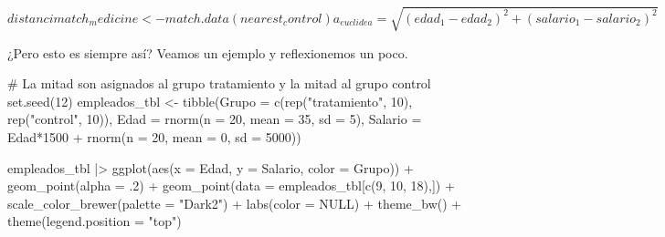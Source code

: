 \documentclass[
  letterpaper,
  DIV=11,
  numbers=noendperiod,
  oneside]{scrreprt}
\newenvironment{Shaded}{\begin{snugshade}}{\end{snugshade}}
\newcommand{\AttributeTok}[1]{\textcolor[rgb]{0.40,0.45,0.13}{#1}}
\newcommand{\CommentTok}[1]{\textcolor[rgb]{0.37,0.37,0.37}{#1}}
\newcommand{\ConstantTok}[1]{\textcolor[rgb]{0.56,0.35,0.01}{#1}}
\newcommand{\DecValTok}[1]{\textcolor[rgb]{0.68,0.00,0.00}{#1}}
\newcommand{\FunctionTok}[1]{\textcolor[rgb]{0.28,0.35,0.67}{#1}}
\newcommand{\NormalTok}[1]{\textcolor[rgb]{0.00,0.23,0.31}{#1}}
\newcommand{\OtherTok}[1]{\textcolor[rgb]{0.00,0.23,0.31}{#1}}
\newcommand{\SpecialCharTok}[1]{\textcolor[rgb]{0.37,0.37,0.37}{#1}}
\newcommand{\StringTok}[1]{\textcolor[rgb]{0.13,0.47,0.30}{#1}}
\begin{document}
\[
distancimatch_medicine <- match.data(nearest_control)a_{euclidea} = \sqrt{(edad_1 - edad_2)^2 + (salario_1 - salario_2)^2}
\]

¿Pero esto es siempre así? Veamos un ejemplo y reflexionemos un poco.

\begin{Shaded}
\begin{Highlighting}[]
\CommentTok{\# La mitad son asignados al grupo tratamiento y la mitad al grupo control}
\FunctionTok{set.seed}\NormalTok{(}\DecValTok{12}\NormalTok{)}
\NormalTok{empleados\_tbl }\OtherTok{\textless{}{-}} \FunctionTok{tibble}\NormalTok{(}\AttributeTok{Grupo =} \FunctionTok{c}\NormalTok{(}\FunctionTok{rep}\NormalTok{(}\StringTok{"tratamiento"}\NormalTok{, }\DecValTok{10}\NormalTok{), }\FunctionTok{rep}\NormalTok{(}\StringTok{"control"}\NormalTok{, }\DecValTok{10}\NormalTok{)),}
                        \AttributeTok{Edad =} \FunctionTok{rnorm}\NormalTok{(}\AttributeTok{n =} \DecValTok{20}\NormalTok{, }\AttributeTok{mean =} \DecValTok{35}\NormalTok{, }\AttributeTok{sd =} \DecValTok{5}\NormalTok{),}
                        \AttributeTok{Salario =}\NormalTok{ Edad}\SpecialCharTok{*}\DecValTok{1500} \SpecialCharTok{+} \FunctionTok{rnorm}\NormalTok{(}\AttributeTok{n =} \DecValTok{20}\NormalTok{, }\AttributeTok{mean =} \DecValTok{0}\NormalTok{, }\AttributeTok{sd =} \DecValTok{5000}\NormalTok{))}

\NormalTok{empleados\_tbl }\SpecialCharTok{|\textgreater{}} \FunctionTok{ggplot}\NormalTok{(}\FunctionTok{aes}\NormalTok{(}\AttributeTok{x =}\NormalTok{ Edad,}
                            \AttributeTok{y =}\NormalTok{ Salario,}
                            \AttributeTok{color =}\NormalTok{ Grupo)) }\SpecialCharTok{+}
  \FunctionTok{geom\_point}\NormalTok{(}\AttributeTok{alpha =}\NormalTok{ .}\DecValTok{2}\NormalTok{) }\SpecialCharTok{+} 
  \FunctionTok{geom\_point}\NormalTok{(}\AttributeTok{data =}\NormalTok{ empleados\_tbl[}\FunctionTok{c}\NormalTok{(}\DecValTok{9}\NormalTok{, }\DecValTok{10}\NormalTok{, }\DecValTok{18}\NormalTok{),]) }\SpecialCharTok{+} 
  \FunctionTok{scale\_color\_brewer}\NormalTok{(}\AttributeTok{palette =} \StringTok{"Dark2"}\NormalTok{) }\SpecialCharTok{+}
  \FunctionTok{labs}\NormalTok{(}\AttributeTok{color =} \ConstantTok{NULL}\NormalTok{) }\SpecialCharTok{+}
  \FunctionTok{theme\_bw}\NormalTok{() }\SpecialCharTok{+}
  \FunctionTok{theme}\NormalTok{(}\AttributeTok{legend.position =} \StringTok{"top"}\NormalTok{)}
\end{Highlighting}
\end{Shaded}
\end{document}
